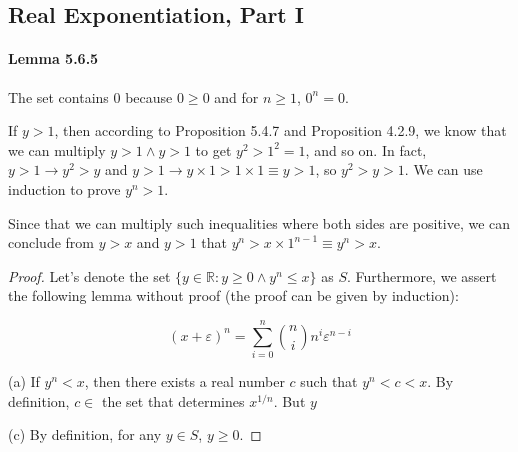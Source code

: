 \subsection{Real Exponentiation, Part I}
\paragraph{Lemma 5.6.5}
The set contains 0 because $0 \geq 0$ and for $n \geq 1$, $0^n = 0$.

If $y>1$, then according to Proposition 5.4.7 and Proposition 4.2.9, we know that we can multiply $y>1\wedge y>1$ to get $y^2>1^2=1$, 
and so on. In fact, $y>1 \to y^2 > y$ and $y>1\to y \times 1 > 1 \times 1 \equiv y >1$, so $y^2>y>1$. We can use induction to prove 
$y^n>1$.

Since that we can multiply such inequalities where both sides are positive, we can conclude from $y>x$ and $y>1$ that $y^n > x \times 1^{n-1} \equiv y^n > x$.

\begin{proof}
Let's denote the set $\{y \in \mathbb{R}:y \geq 0 \wedge y^n \leq x\}$ as $S$. Furthermore, we assert the following lemma without proof (the proof can be given by induction):
\begin{lem}
\[
(x+\varepsilon)^n = \sum_{i=0}^n{\binom{n}{i}n^i\varepsilon^{n-i}}
\]
\end{lem}


(a) If $y^n < x$, then there exists a real number $c$ such that $y^n < c < x$. By definition, $c \in$ the set that determines $x^{1/n}$. But $y$

(c) By definition, for any $y \in S$, $y \geq 0$.
\end{proof}
